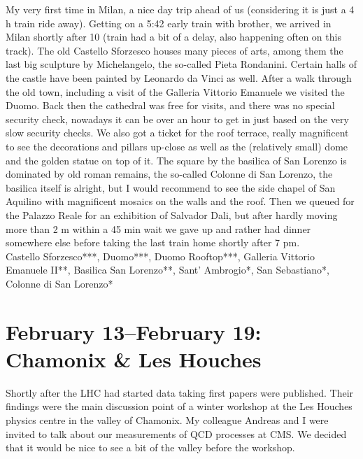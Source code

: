 My very first time in Milan, a nice day trip ahead of us (considering it is just a 4 h train ride away). Getting on a 5:42 early train with brother, we arrived in Milan shortly after 10 (train had a bit of a delay, also happening often on this track). The old Castello Sforzesco houses many pieces of arts, among them the last big sculpture by Michelangelo, the so-called Pieta Rondanini. Certain halls of the castle have been painted by Leonardo da Vinci as well. After a walk through the old town, including a visit of the Galleria Vittorio Emanuele we visited the Duomo. Back then the cathedral was free for visits, and there was no special security check, nowadays it can be over an hour to get in just based on the very slow security checks. We also got a ticket for the roof terrace, really magnificent to see the decorations and pillars up-close as well as the (relatively small) dome and the golden statue on top of it. The square by the basilica of San Lorenzo is dominated by old roman remains, the so-called Colonne di San Lorenzo, the basilica itself is alright, but I would recommend to see the side chapel of San Aquilino with magnificent mosaics on the walls and the roof. Then we queued for the Palazzo Reale for an exhibition of Salvador Dali, but after hardly moving more than 2 m within a 45 min wait we gave up and rather had dinner somewhere else before taking the last train home shortly after 7 pm.\\

Castello Sforzesco***, Duomo***, Duomo Rooftop***, Galleria Vittorio Emanuele II**, Basilica San Lorenzo**, Sant' Ambrogio*, San Sebastiano*, Colonne di San Lorenzo*

\section{February 13--February 19: Chamonix \& Les Houches}
\label{LesHouches2011}

Shortly after the LHC had started data taking first papers were published. Their findings were the main discussion point of a winter workshop at the Les Houches physics centre in the valley of Chamonix. My colleague Andreas and I were invited to talk about our measurements of QCD processes at CMS. We decided that it would be nice to see a bit of the valley before the workshop.\\

